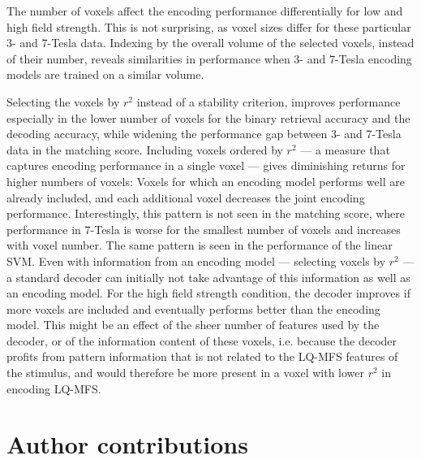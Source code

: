The number of voxels affect the encoding performance differentially for low and
high field strength. This is not surprising, as voxel sizes differ for these
particular 3- and 7-Tesla data. Indexing by the overall volume of the selected
voxels, instead of their number, reveals similarities in performance when 3-
and 7-Tesla encoding models are trained on a similar volume. 

Selecting the voxels by $r^2$ instead of a stability criterion, improves
performance especially in the lower number of voxels for the binary retrieval
accuracy and the decoding accuracy, while widening the performance gap between
3- and 7-Tesla data in the matching score. Including voxels ordered by $r^2$
--- a measure that captures encoding performance in a single voxel --- gives
diminishing returns for higher numbers of voxels: Voxels for which an encoding
model performs well are already included, and each additional voxel decreases
the joint encoding performance.  Interestingly, this pattern is not seen in the
matching score, where performance in 7-Tesla is worse for the smallest number
of voxels and increases with voxel number. The same pattern is seen in the
performance of the linear SVM. Even with information from an encoding model ---
selecting voxels by $r^2$ --- a standard decoder can initially not take
advantage of this information as well as an encoding model. For the high field
strength condition, the decoder improves if more voxels are included and
eventually performs better than the encoding model. This might be an effect of
the sheer number of features used by the decoder, or of the information content
of these voxels, i.e. because the decoder profits from pattern information that
is not related to the LQ-MFS features of the stimulus, and would therefore be
more present in a voxel with lower $r^2$ in encoding LQ-MFS.


\section*{Author contributions}

